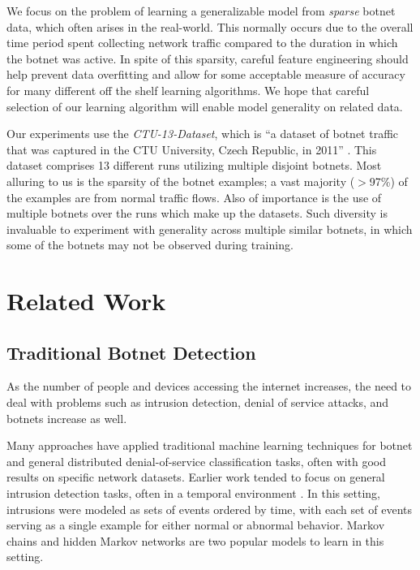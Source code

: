 \documentclass[letterpaper]{article}
\begin{document}
We focus on the problem of learning a generalizable model from \emph{sparse} botnet data, which often arises in the real-world.  This normally occurs due to the overall time period spent collecting network traffic compared to the duration in which the botnet was active.  In spite of this sparsity, careful feature engineering should help prevent data overfitting and allow for some acceptable measure of accuracy for many different off the shelf learning algorithms.  We hope that careful selection of our learning algorithm will enable model generality on related data.

Our experiments use the \emph{CTU-13-Dataset}, which is ``a dataset of botnet traffic that was captured in the CTU University, Czech Republic, in 2011'' \cite{garcia2014empirical}.  This dataset comprises 13 different runs utilizing multiple disjoint botnets.  Most alluring to us is the sparsity of the botnet examples; a vast majority ($>$97\%) of the examples are from normal traffic flows.  Also of importance is the use of multiple botnets over the runs which make up the datasets.  Such diversity is invaluable to experiment with generality across multiple similar botnets, in which some of the botnets may not be observed during training.

\section{Related Work}

\subsection{Traditional Botnet Detection}

As the number of people and devices accessing the internet increases, the need to deal with problems such as intrusion detection, denial of service attacks, and botnets increase as well.

Many approaches have applied traditional machine learning techniques for botnet and general distributed denial-of-service classification tasks, often with good results on specific network datasets.  Earlier work tended to focus on general intrusion detection tasks, often in a temporal environment \cite{Ye00amarkov,1174909,Joshi:2005:IHM:1167350.1167387,Xu:2007:DDA:1763599.1763621}.  In this setting, intrusions were modeled as sets of events ordered by time, with each set of events serving as a single example for either normal or abnormal behavior. Markov chains and hidden Markov networks are two popular models to learn in this setting.
\end{document}
